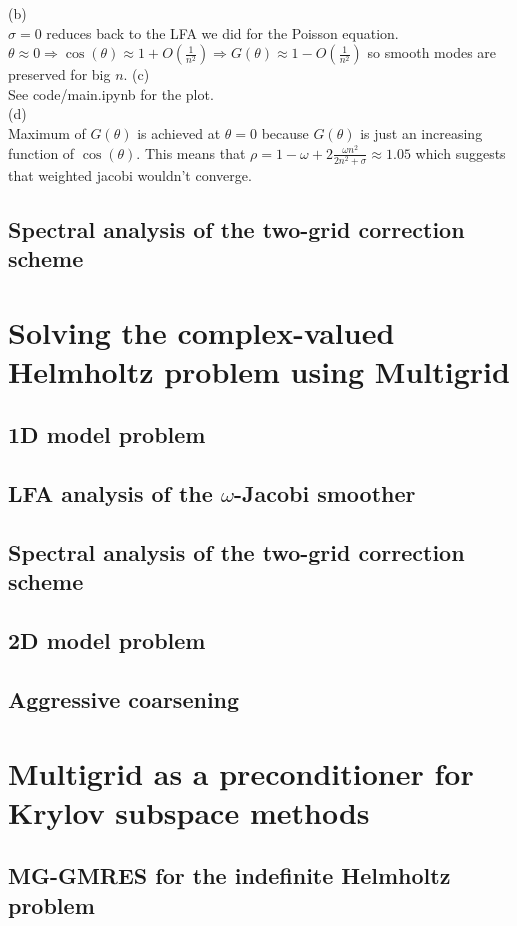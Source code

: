 \documentclass[a4paper,12pt]{article}
\begin{document}
(b) \\
$\sigma = 0$ reduces back to the LFA we did for the Poisson equation.
$\theta \approx 0 \Rightarrow \cos(\theta)
    \approx 1 + O \left(\frac{1}{n^{2}}\right) \Rightarrow G(\theta) \approx 1 - O \left(\frac{1}{n^{2}}\right)$
so smooth modes are preserved for big $n$.
(c) \\
See code/main.ipynb for the plot. \\

(d)\\
Maximum of $G(\theta)$ is achieved at $\theta =0$ because $G(\theta)$ is just
an increasing function of $\cos(\theta)$. This means that
$\rho = 1-\omega + 2 \frac{\omega n^{2}}{2 n^{2} + \sigma}  \approx 1.05 $
which suggests that weighted jacobi wouldn't converge.


\subsection{Spectral analysis of the two-grid correction scheme}

\section{Solving the complex-valued Helmholtz problem using Multigrid}

\subsection{1D model problem}

\subsection{LFA analysis of the $\omega$-Jacobi smoother}

\subsection{Spectral analysis of the two-grid correction scheme}

\subsection{2D model problem}

\subsection{Aggressive coarsening}

\section{Multigrid as a preconditioner for Krylov subspace methods}

\subsection{MG-GMRES for the indefinite Helmholtz problem}
\end{document}
